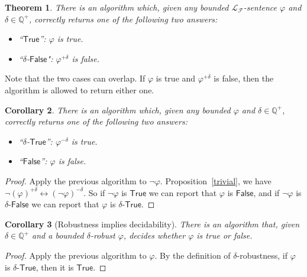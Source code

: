 \documentclass[conference]{IEEEtran}
\newtheorem{theorem}{Theorem}
\newtheorem{corollary}[theorem]{Corollary}
\begin{document}
\begin{theorem}\label{main}
There is an algorithm which, given any bounded $\mathcal{L}_{\mathcal{F}}$-sentence $\varphi$ and $\delta\in \mathbb{Q}^+$, correctly returns one of the following two answers:
\begin{itemize}
\item ``$\mathsf{True}$'': $\varphi$ is true. 
\item ``$\delta$-$\mathsf{False}$": $\varphi^{+\delta}$ is false. 
\end{itemize}
\end{theorem}

Note that the two cases can overlap. If $\varphi$ is true and $\varphi^{+\delta}$ is false, then the algorithm is allowed to return either one. 

\begin{corollary}
There is an algorithm which, given any bounded $\varphi$ and $\delta\in \mathbb{Q}^+$, correctly returns one of the following two answers:
\begin{itemize}
\item ``$\delta$-$\mathsf{True}$'': $\varphi^{-\delta}$ is true. 
\item ``$\mathsf{False}$'': $\varphi$ is false. 
\end{itemize} 
\end{corollary}

\begin{proof}
Apply the previous algorithm to $\neg\varphi$. Proposition~\ref{trivial}, we have $\neg(\varphi)^{+\delta}\leftrightarrow (\neg\varphi)^{-\delta}$. So if $\neg\varphi$ is $\mathsf{True}$ we can report that $\varphi$ is $\mathsf{False}$, and if $\neg\varphi$ is $\delta$-$\mathsf{False}$ we can report that $\varphi$ is $\delta$-$\mathsf{True}$.
\end{proof}

\begin{corollary}[Robustness implies decidability]\label{point}
There is an algorithm that, given $\delta\in \mathbb{Q}^+$ and a bounded $\delta$-robust $\varphi$, decides whether $\varphi$ is true or false. 
\end{corollary}

\begin{proof}
Apply the previous algorithm to $\varphi$. By the definition of $\delta$-robustness, if $\varphi$ is $\delta$-$\mathsf{True}$, then it is $\mathsf{True}$.  
\end{proof}
\end{document}
